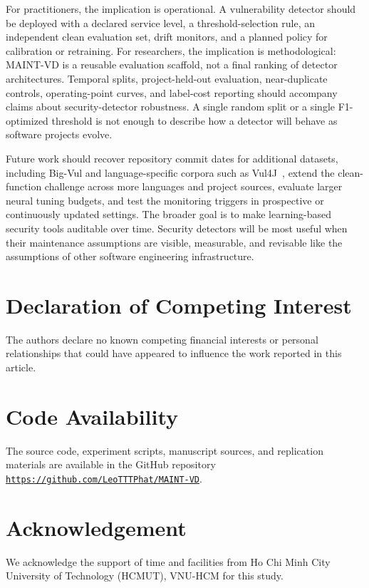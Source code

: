 \documentclass[a4paper,fleqn]{cas-dc}
\begin{document}
For practitioners, the implication is operational. A vulnerability detector
should be deployed with a declared service level, a threshold-selection rule,
an independent clean evaluation set, drift monitors, and a planned policy for
calibration or retraining. For researchers, the implication is methodological:
MAINT-VD is a reusable evaluation scaffold, not a final ranking of detector
architectures. Temporal splits, project-held-out evaluation, near-duplicate
controls, operating-point curves, and label-cost reporting should accompany
claims about security-detector robustness. A single random split or a single
F1-optimized threshold is not enough to describe how a detector will behave as
software projects evolve.

Future work should recover repository commit dates for additional datasets,
including Big-Vul and language-specific corpora such as Vul4J~\cite{bui2022vul4j},
extend the clean-function challenge across more languages and project sources,
evaluate larger neural tuning budgets, and test the monitoring triggers in
prospective or continuously updated settings. The broader goal is to make
learning-based security tools auditable over time. Security detectors will be
most useful when their maintenance assumptions are visible, measurable, and
revisable like the assumptions of other software engineering infrastructure.

\printcredits

\section*{Declaration of Competing Interest}

The authors declare no known competing financial interests or personal
relationships that could have appeared to influence the work reported in this
article.

\section*{Code Availability}

The source code, experiment scripts, manuscript sources, and replication
materials are available in the GitHub repository
\href{https://github.com/LeoTTTPhat/MAINT-VD}
{\texttt{https://github.com/LeoTTTPhat/MAINT-VD}}.

\section*{Acknowledgement}

We acknowledge the support of time and facilities from Ho Chi Minh City
University of Technology (HCMUT), VNU-HCM for this study.



\end{document}
